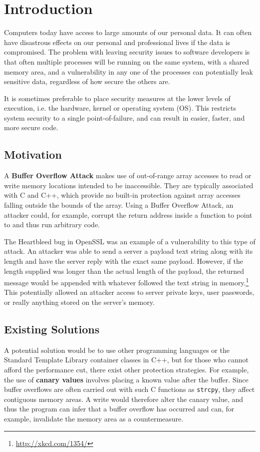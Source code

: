 \chapter{Introduction}
Computers today have access to large amounts of our personal data. It can often have disastrous effects on our personal and professional lives if the data is compromised. The problem with leaving security issues to software developers is that often multiple processes will be running on the same system, with a shared memory area, and a vulnerability in any one of the processes can potentially leak sensitive data, regardless of how secure the others are.

It is sometimes preferable to place security measures at the lower levels of execution, i.e. the hardware, kernel or operating system (OS). This restricts system security to a single point-of-failure, and can result in easier, faster, and more secure code.

\section{Motivation}
A \textbf{Buffer Overflow Attack} makes use of out-of-range array accesses to read or write memory locations intended to be inaccessible. They are typically associated with C and C++, which provide no built-in protection against array accesses falling outside the bounds of the array. Using a Buffer Overflow Attack, an attacker could, for example, corrupt the return address inside a function to point to and thus run arbitrary code.

The Heartbleed bug in OpenSSL\cite{heartbleed} was an example of a vulnerability to this type of attack. An attacker was able to send a server a payload text string along with its length and have the server reply with the exact same payload. However, if the length supplied was longer than the actual length of the payload, the returned message would be appended with whatever followed the text string in memory.\footnote{\url{http://xkcd.com/1354/}} This potentially allowed an attacker access to server private keys, user passwords, or really anything stored on the server's memory.

\section{Existing Solutions}
A potential solution would be to use other programming languages or the Standard Template Library container classes in C++, but for those who cannot afford the performance cut, there exist other protection strategies. For example, the use of \textbf{canary values} involves placing a known value after the buffer. Since buffer overflows are often carried out with such C functions as \verb|strcpy|, they affect contiguous memory areas. A write would therefore alter the canary value, and thus the program can infer that a buffer overflow has occurred and can, for example, invalidate the memory area as a countermeasure.

